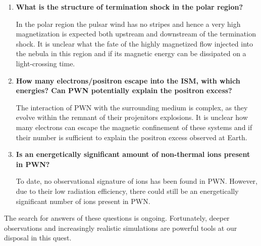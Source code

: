 \begin{enumerate}
\item \textbf{What is the structure of termination shock in the polar region? }

In the polar region the pulsar wind has no stripes and hence a very high magnetization is expected both upstream and downstream of the termination shock. It is unclear what the fate of the highly magnetized flow injected into the nebula in this region and if its magnetic energy can be dissipated on a light-crossing time.

\item \textbf{How many electrons/positron escape into the ISM, with which energies? Can PWN potentially explain the positron excess?}

The interaction of PWN with the surrounding medium is complex, as they evolve within the remnant of their projenitors explosions. It is unclear how many electrons can escape the magnetic confinement of these systems and if their number is sufficient to explain the positron excess observed at Earth.

\item \textbf{Is an energetically significant amount of non-thermal  ions present in PWN?}

To date, no observational signature of ions has been found in PWN. However, due to their low radiation efficiency, there could still be an energetically significant number of ions present in PWN.

\end{enumerate}

The search for answers of these questions is ongoing. Fortunately, deeper observations and increasingly realistic simulations are powerful tools at our disposal in this quest.
